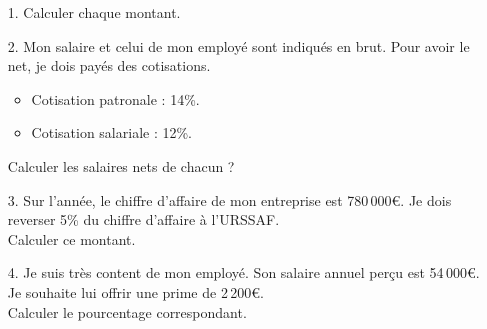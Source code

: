 \begin{enumerate}
  \item[1.] Calculer chaque montant.
  \item[2.] Mon salaire et celui de mon employé sont indiqués en brut. Pour avoir le net, je dois payés des cotisations.
  \begin{itemize}[label={$\bullet$}]
    \item Cotisation patronale : 14\%.
    \item Cotisation salariale : 12\%.
  \end{itemize}
  Calculer les salaires nets de chacun ?
  \item[3.] Sur l'année, le chiffre d'affaire de mon entreprise est 780\,000€. Je dois reverser 5\% du chiffre d'affaire à l'URSSAF. \\
  Calculer ce montant.
  \item[4.] Je suis très content de mon employé. Son salaire annuel perçu est 54\,000€. Je souhaite lui offrir une prime de 2\,200€. \\
  Calculer le pourcentage correspondant. 
\end{enumerate}

